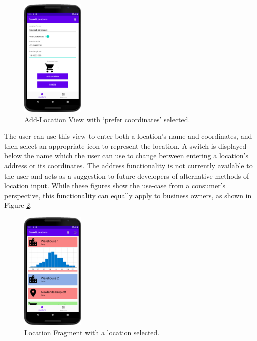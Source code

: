 \begin{figure}[ht]
    \centering
    \includegraphics[width=0.268\textwidth]{figures/EnterLocation.PNG}
    \caption{Add-Location View with `prefer coordinates' selected.}
    \label{fig:enter_location}
\end{figure}

The user can use this view to enter both a location's name and coordinates, and then select an appropriate icon to represent the location. A switch is displayed below the name which the user can use to change between entering a location's address or its coordinates. The address functionality is not currently available to the user and acts as a suggestion to future developers of alternative methods of location input. While these figures show the use-case from a consumer's perspective, this functionality can equally apply to business owners, as shown in Figure \ref{fig:business_extended}.

\begin{figure}[ht]
    \centering
    \includegraphics[width=0.268\textwidth]{figures/BusinessExtended.PNG}
    \caption{Location Fragment with a location selected.}
    \label{fig:business_extended}
\end{figure}

